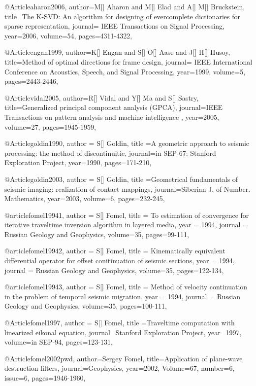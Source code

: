 @Article{aharon2006,
  author={M[] Aharon and M[] Elad and A[] M[] Bruckstein},
  title={The {K}-{SVD}: An algorithm for designing of evercomplete dictionaries for sparse representation},
  journal={ IEEE Transactions on Signal Processing},
  year=2006,
  volume=54,
  pages={4311-4322},
}

@Article{engan1999,
  author={K[] Engan and S[] O[] Aase and J[] H[] Husoy},
  title={Method of optimal directions for frame design},
  journal={ IEEE International Conference on Acoustics, Speech, and Signal Processing},
  year=1999,
  volume=5,
  pages={2443-2446},
}

@Article{vidal2005,
  author={R[] Vidal and Y[] Ma and S[] Sastry},
  title={Generalized principal component analysis (GPCA)},
  journal={IEEE Transactions on pattern analysis and machine intelligence
},
  year=2005,
  volume=27,
  pages={1945-1959},
}

@Article{goldin1990,
  author = {S[] Goldin},
  title ={A geometric approach to seismic processing: the method of discontinuitie},
  journal={in SEP-67: Stanford Exploration Project},
  year=1990,
  pages={171-210},
}

@Article{goldin2003,
  author = {S[] Goldin},
  title ={Geometrical fundamentals of seismic imaging: realization of contact mappings},
  journal={Siberian J. of Number. Mathematics},
  year=2003,
  volume=6,
  pages={232-245},
}

@article{fomel19941,
  author =	 {S[] Fomel},
  title =	 {To estimation of convergence for iterative traveltime inversion algorithm in layered media},
  year =	 1994,
  journal =	 {Russian Geology and Geophysics},
  volume={35},
 pages=99-111,
}

@article{fomel19942,
  author =	 {S[] Fomel},
  title =	 {Kinematically equivalent differential operator for offset conitinuation of seismic sections},
  year =	 1994,
  journal =	 {Russian Geology and Geophysics},
  volume={35},
 pages=122-134,
}

@article{fomel19943,
  author =	 {S[] Fomel},
  title =	 {Method of velocity continuation in the problem of temporal seismic migration},
  year =	 1994,
  journal =	 {Russian Geology and Geophysics},
  volume={35},
 pages=100-111,
}

@Article{fomel1997,
  author = {S[] Fomel},
  title ={Traveltime computation with linearized eikonal equation},
  journal={Stanford Exploration Project},
  year=1997,
  volume={in SEP-94},
  pages={123-131},
}

@Article{fomel2002pwd,
  author={Sergey Fomel},
  title={Application of plane-wave destruction filters},
  journal={Geophysics},
  year=2002,
  Volume=67,
  number=6,
  issue=6,
  pages={1946-1960},
}



